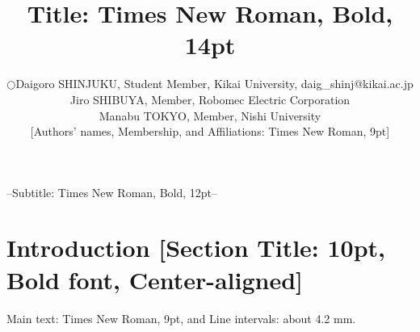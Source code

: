 \documentclass[a4paper]{article}
\begin{document}
\makeatletter
\title{Title: Times New Roman, Bold, 14pt}
{--Subtitle: Times New Roman, Bold, 12pt--}%
{}%
{}%

\author{ \small
\begin{tabular}{ll}
 $\bigcirc$ & Daigoro SHINJUKU, Student Member,  Kikai University, daig\_shinj@kikai.ac.jp\\%
  & Jiro SHIBUYA, Member, Robomec Electric Corporation\\
  & Manabu TOKYO, Member, Nishi University\\
  & [Authors' names, Membership, and Affiliations: Times New Roman, 9pt]
\end{tabular}
}
\makeatother



\date{} %

\maketitle
\thispagestyle{empty}
\pagestyle{empty}

\small
\section{Introduction [Section Title: 10pt, \protect\\ Bold font, Center-aligned]}%
Main text: Times New Roman, 9pt, and Line intervals: about 4.2 mm.
\end{document}
